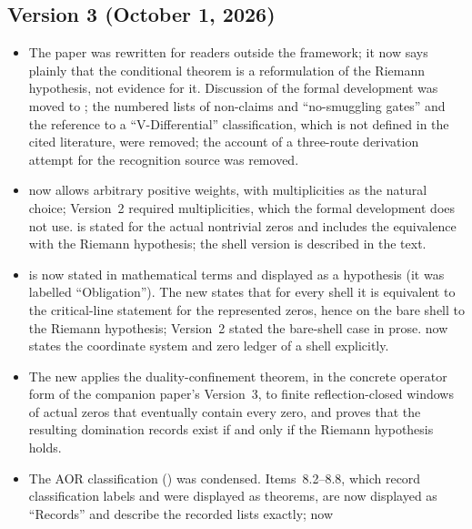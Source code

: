 \documentclass[11pt]{article}
\theoremstyle{definition}
\begin{document}
\subsection*{Version 3 (October 1, 2026)}

\begin{itemize}
  \item The paper was rewritten for readers outside the framework; it
    now says plainly that the conditional theorem is a reformulation of
    the Riemann hypothesis, not evidence for it.  Discussion of the formal
    development was moved to ; the numbered
    lists of non-claims and ``no-smuggling gates'' and the reference to
    a ``V-Differential'' classification, which is not defined in the
    cited literature, were removed; the account of a three-route
    derivation attempt for the recognition source was removed.
  \item {} now allows arbitrary
    positive weights, with multiplicities as the natural choice;
    Version~2 required multiplicities, which the formal development does
    not use.   is stated for the actual
    nontrivial zeros and includes the equivalence with the Riemann
    hypothesis; the shell version is described in the text.
  \item {} is now stated in mathematical
    terms and displayed as a hypothesis (it was labelled
    ``Obligation'').  The new  states that for every shell it
    is equivalent to the critical-line statement for the represented
    zeros, hence on the bare shell to the Riemann hypothesis; Version~2
    stated the bare-shell case in prose.  
    now states the coordinate system and zero ledger of a shell
    explicitly.
  \item The new  applies the
    duality-confinement theorem, in the concrete operator form of the
    companion paper's Version~3, to finite reflection-closed windows of
    actual zeros that eventually contain every zero, and proves that the
    resulting domination records exist if and only if the Riemann
    hypothesis holds.
  \item The AOR classification () was
    condensed.  Items~8.2--8.8, which record classification labels and
    were displayed as theorems, are now displayed as ``Records'' and
    describe the recorded lists exactly;  now

\end{itemize}
\end{document}
